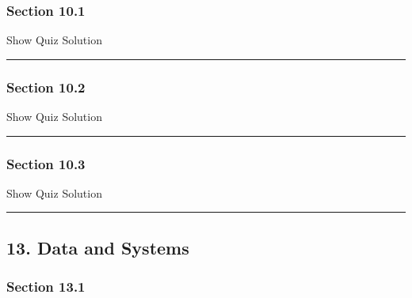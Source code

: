 \documentclass[]{article}
\begin{document}
\subsubsection{Section 10.1}\label{section-10.1}

\hypertarget{surveyElement101}{}

\hypertarget{surveyResult101}{}

Show Quiz Solution

\hypertarget{display.Quiz101.2}{}
\begin{center}\rule{0.5\linewidth}{\linethickness}\end{center}

\subsubsection{Section 10.2}\label{section-10.2}

\hypertarget{surveyElement102}{}

\hypertarget{surveyResult102}{}

Show Quiz Solution

\hypertarget{display.Quiz102.2}{}
\begin{center}\rule{0.5\linewidth}{\linethickness}\end{center}

\subsubsection{Section 10.3}\label{section-10.3}

\hypertarget{surveyElement103}{}

\hypertarget{surveyResult103}{}

Show Quiz Solution

\hypertarget{display.Quiz103.2}{}
\begin{center}\rule{0.5\linewidth}{\linethickness}\end{center}

\subsection{13. Data and Systems}\label{data-and-systems}

\subsubsection{Section 13.1}\label{section-13.1}

\hypertarget{surveyElement131}{}
\end{document}
